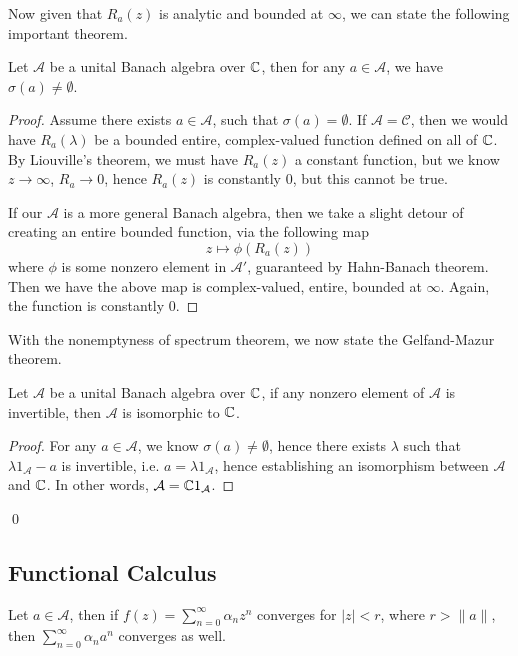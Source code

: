 Now given that $R_a(z)$ is analytic and bounded at $\infty$, we can state the following important theorem.
\begin{theorem}
    Let $\mathcal{A}$ be a unital Banach algebra over $\mathbb{C}$, then for any $a\in\mathcal{A}$, we have $\sigma(a)\neq\emptyset$.
\end{theorem}
\begin{proof}
    Assume there exists $a\in\mathcal{A}$, such that $\sigma(a)=\emptyset$.
    If $\mathcal{A}=\mathcal{C}$, then we would have $R_a(\lambda)$ be a bounded entire, complex-valued function defined on all of $\mathbb{C}$. By Liouville's theorem, we must have $R_a(z)$ a constant function, but we know $z\to\infty$, $R_a\to 0$, hence $R_a(z)$ is constantly 0, but this cannot be true. 

    If our $\mathcal{A}$ is a more general Banach algebra, then we take a slight detour of creating an entire bounded function, via the following map
    \begin{equation*}
        z\mapsto \phi(R_a(z))
    \end{equation*}
    where $\phi$ is some nonzero element in $\mathcal{A}'$, guaranteed by Hahn-Banach theorem. Then we have the above map is complex-valued, entire, bounded at $\infty$. Again, the function is constantly 0. 
\end{proof}

With the nonemptyness of spectrum theorem, we now state the Gelfand-Mazur theorem.
\begin{theorem}
    Let $\mathcal{A}$ be a unital Banach algebra over $\mathbb{C}$, if any nonzero element of $\mathcal{A}$ is invertible, then $\mathcal{A}$ is isomorphic to $\mathbb{C}$.
\end{theorem}
\begin{proof}
    For any $a\in\mathcal{A}$, we know $\sigma(a)\neq\emptyset$, hence there exists $\lambda$ such that $\lambda1_\mathcal{A}-a$ is invertible, i.e. $a=\lambda1_\mathcal{A}$, hence establishing an isomorphism between $\mathcal{A}$ and $\mathbb{C}$. In other words, $\mathcal{A}=\mathbb{C}1_\mathcal{A}$.
\end{proof}
\qed


\subsection{Functional Calculus}
\begin{proposition}
    Let $a\in\mathcal{A}$, then if $f(z)=\sum_{n=0}^\infty \alpha_nz^n$ converges for $|z|<r$, where $r>\|a\|$, then $\sum_{n=0}^\infty\alpha_na^n$ converges as well.
\end{proposition}

